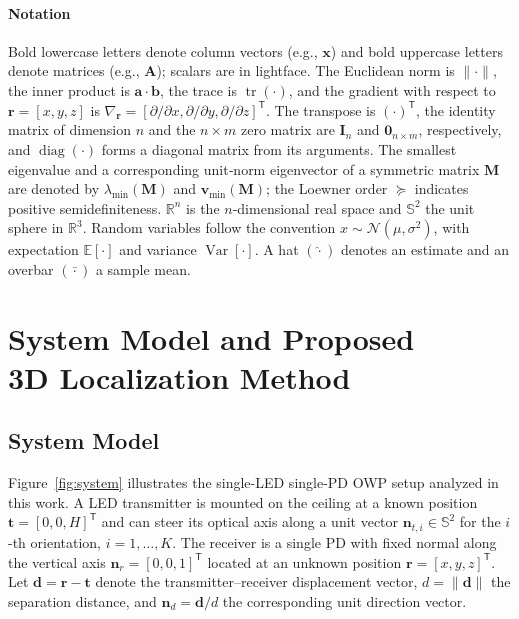 \documentclass[journal]{IEEEtran}
\begin{document}
\paragraph*{Notation}
Bold lowercase letters denote column vectors (e.g., $\mathbf x$) and bold uppercase letters denote matrices (e.g., $\mathbf A$); scalars are in lightface. The Euclidean norm is $\lVert\cdot\rVert$, the inner product is $\mathbf a\!\cdot\!\mathbf b$, the trace is $\operatorname{tr}(\cdot)$, and the gradient with respect to $\mathbf{r}=[x,y,z]$ is $\nabla_{\mathbf r}=[\partial/\partial x,\partial/\partial y,\partial/\partial z]^{\mathsf T}$. The transpose is $(\cdot)^{\mathsf T}$, 
the identity matrix of dimension $n$ and the $n\times m$ zero matrix are $\mathbf{I}_n$ and $\mathbf{0}_{n\times m}$, respectively, and $\operatorname{diag}(\cdot)$ forms a diagonal matrix from its arguments. The smallest eigenvalue and a corresponding unit‐norm eigenvector of a symmetric matrix $\mathbf M$ are denoted by $\lambda_{\min}(\mathbf M)$ and $\mathbf v_{\min}(\mathbf M)$; the Loewner order $\succeq$ indicates positive semidefiniteness. $\mathbb R^n$ is the $n$-dimensional real space and $\mathbb S^{2}$ the unit sphere in $\mathbb R^{3}$. Random variables follow the convention $x\sim\mathcal N(\mu,\sigma^{2})$, with expectation $\mathbb E[\cdot]$ and variance $\operatorname{Var}[\cdot]$. A hat $(\hat{\cdot})$ denotes an estimate and an overbar $(\bar{\cdot})$ a sample mean. 

 
\section{System Model and Proposed \\3D Localization Method}
\label{sec:SystemModel}
\subsection{System Model}

Figure~\ref{fig:system} illustrates the single-LED single-PD OWP setup analyzed in this work.  
A LED transmitter is mounted on the ceiling at a known position  
\(\mathbf{t}=[0,0,H]^{\mathsf T}\) and can steer its optical axis along a unit vector
\(\mathbf{n}_{t,i}\!\in\!\mathbb{S}^{2}\) for the \(i\)-th orientation, \(i=1,\dots,K\).  
The receiver is a single PD with fixed normal along the vertical axis
\(\mathbf{n}_{r}=[0,0,1]^{\mathsf T}\) located at an unknown position  
\(\mathbf{r}=[x,y,z]^{\mathsf T}\).  
Let \(\mathbf{d}=\mathbf{r}-\mathbf{t}\) denote the transmitter--receiver displacement vector, \(d=\lVert \mathbf{d}\rVert\) the separation distance, and \(\mathbf{n}_{d}= \mathbf{d}/d\) the corresponding unit direction vector.
\end{document}

